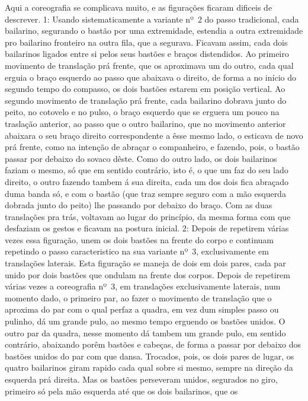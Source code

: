 Aqui a coreografia se complicava muito, e as figurações ficaram dificeis
de descrever. 1: Usando sistematicamente a variante nº~2 do passo
tradicional, cada bailarino, segurando o bastão por uma extremidade,
estendia a outra extremidade pro bailarino fronteiro na outra fila, que
a segurava. Ficavam assim, cada dois bailarinos ligados entre si pelos
seus bastões e braços distendidos. Ao primeiro movimento de translação
prá frente, que os aproximava um do outro, cada qual erguia o braço
esquerdo ao passo que abaixava o direito, de forma a no início do
segundo tempo do compasso, os dois bastões estarem em posição vertical.
Ao segundo movimento de translação prá frente, cada bailarino dobrava
junto do peito, no cotovelo e no pulso, o braço esquerdo que se erguera
um pouco na traslação anterior, ao passo que o outro bailarino, que no
movimento anterior abaixara o seu braço direito correspondente a êsse
mesmo lado, o esticava de novo prá frente, como na intenção de abraçar o
companheiro, e fazendo, pois, o bastão passar por debaixo do sovaco
dêste. Como do outro lado, os dois bailarinos faziam o mesmo, só que em
sentido contrário, isto é, o que um faz do seu lado direito, o outro
fazendo tambem á sua direita, cada um dos dois fica abraçado duma banda
só, e com o bastão (que traz sempre seguro com a mão esquerda dobrada
junto do peito) lhe passando por debaixo do braço. Com as duas
translações pra trás, voltavam ao lugar do princípio, da mesma forma com
que desfaziam os gestos e ficavam na postura inicial. 2: Depois de
repetirem várias vezes essa figuração, unem os dois bastões na frente do
corpo e continuam repetindo o passo caracteristico na sua variante nº~3,
exclusivamente em translações laterais. Esta figuração se maneja de dois
em dois pares, cada par unido por dois bastões que ondulam na frente dos
corpos. Depois de repetirem várias vezes a coreografia nº~3, em
translações exclusivamente laterais, num momento dado, o primeiro par,
ao fazer o movimento de translação que o aproxima do par com o qual
perfaz a quadra, em vez dum simples passo ou pulinho, dá um grande pulo,
ao mesmo tempo erguendo os bastões unidos. O outro par da quadra, nesse
momento dá tambem um grande pulo, em sentido contrário, abaixando porêm
bastões e cabeças, de forma a passar por debaixo dos bastões unidos do
par com que dansa. Trocados, pois, os dois pares de lugar, os quatro
bailarinos giram rapido cada qual sobre si mesmo, sempre na direção da
esquerda prá direita. Mas os bastões perseveram unidos, segurados no
giro, primeiro só pela mão esquerda até que os dois bailarinos, que os
